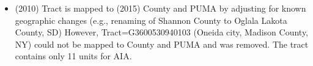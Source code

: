 \begin{itemize}
\item (2010) Tract is mapped to (2015) County and PUMA by adjusting for known geographic changes (e.g., renaming of Shannon County to Oglala Lakota County, SD) However, Tract=G3600530940103 (Oneida city, Madison County, NY) could not be mapped to County and PUMA and was removed. The tract contains only 11 units for AIA.
\end{itemize}
